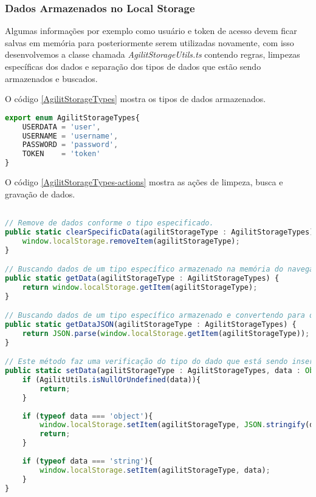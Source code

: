 \subsubsection{Dados Armazenados no Local Storage}
Algumas informações por exemplo como usuário e token de acesso devem ficar salvas em memória para posteriormente serem utilizadas novamente, com isso desenvolvemos a classe chamada \textit{AgilitStorageUtils.ts} contendo regras, limpezas específicas dos dados e separação dos tipos de dados que estão sendo armazenados e buscados.

O código \ref{AgilitStorageTypes} mostra os tipos de dados armazenados.
\begin{lstlisting}[language=JavaScript, caption={Tipos de dados armazenados}, label={AgilitStorageTypes}]
export enum AgilitStorageTypes{
	USERDATA = 'user',
	USERNAME = 'username',
	PASSWORD = 'password',
	TOKEN    = 'token'
}
\end{lstlisting}

O código \ref{AgilitStorageTypes-actions} mostra as ações de limpeza, busca e gravação de dados.

\begin{lstlisting}[language=JavaScript, caption={Tipos de dados armazenados}, label={AgilitStorageTypes-actions}]

// Remove de dados conforme o tipo especificado.
public static clearSpecificData(agilitStorageType : AgilitStorageTypes) {
	window.localStorage.removeItem(agilitStorageType);
}

// Buscando dados de um tipo específico armazenado na memória do navegador.
public static getData(agilitStorageType : AgilitStorageTypes) {
	return window.localStorage.getItem(agilitStorageType);
}

// Buscando dados de um tipo específico armazenado e convertendo para objeto.
public static getDataJSON(agilitStorageType : AgilitStorageTypes) {
	return JSON.parse(window.localStorage.getItem(agilitStorageType));
}

// Este método faz uma verificação do tipo do dado que está sendo inserido na memória do navegador.
public static setData(agilitStorageType : AgilitStorageTypes, data : Object|Array<any>|string) {
	if (AgilitUtils.isNullOrUndefined(data)){
		return;
	}
	
	if (typeof data === 'object'){
		window.localStorage.setItem(agilitStorageType, JSON.stringify(data));
		return;
	}
	
	if (typeof data === 'string'){
		window.localStorage.setItem(agilitStorageType, data);
	}    
}
\end{lstlisting}

